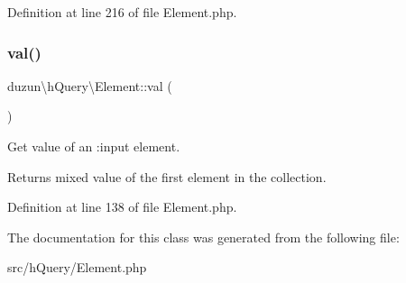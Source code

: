 Definition at line 216 of file Element.\+php.

\mbox{\label{classduzun_1_1hQuery_1_1Element_a0ec6920ccb04c246df8490afeb89baf4}} 
\subsubsection{\texorpdfstring{val()}{val()}}
{\footnotesize\ttfamily duzun\textbackslash{}h\+Query\textbackslash{}\+Element\+::val (\begin{DoxyParamCaption}{ }\end{DoxyParamCaption})}

Get value of an \+:input element.

\begin{DoxyReturn}{Returns}
mixed value of the first element in the collection. 
\end{DoxyReturn}


Definition at line 138 of file Element.\+php.



The documentation for this class was generated from the following file\+:\begin{DoxyCompactItemize}
\item 
src/h\+Query/Element.\+php\end{DoxyCompactItemize}
